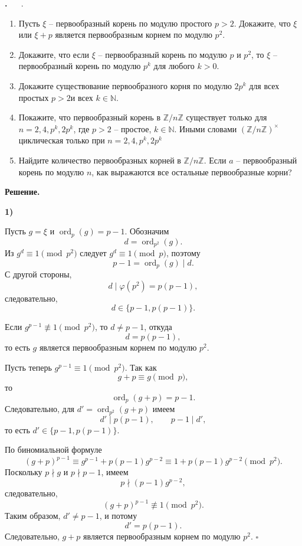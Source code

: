 \documentclass[12pt,a4paper]{article}
\newcounter{task}                   %
\newenvironment{task}[1][]{%
  \refstepcounter{task}%
  \par\vspace{0.3\baselineskip}%
  \noindent\textbf{\thetask.}%
  \if\relax\detokenize{#1}\relax   %
    \ \ignorespaces                 %
  \else
    \ \textbf{#1}.\ \ignorespaces   %
  \fi
}{%
  \par\vspace{0.2\baselineskip}%
}
\newcommand{\sol}{%
  \par\vspace{0.3\baselineskip}%
  \noindent\textbf{Решение.}\ %
  \ignorespaces                     %
}
\newcommand{\soli}[1]{%
  \par\vspace{0.15\baselineskip}%
  \noindent\textbf{#1)}\ %
  \ignorespaces                     %
}
\begin{document}
\begin{task}
    \begin{enumerate}
	\item Пусть $\xi$ -- первообразный корень по модулю простого $p > 2$. Докажите, что $\xi$ или $\xi + p$ является первообразным корнем по модулю $p^2$.
	\item Докажите, что если $\xi$ -- первообразный корень по модулю $p$ и $p^2$, то $\xi$ -- первообразный корень по модулю $p^k$ для любого $k > 0$.
	\item Докажите существование первообразного корня по модулю $2p^k$ для всех простых $p > 2$и всех $k \in \mathbb{N}$.
	\item Покажите, что первообразный корень в $\mathbb{Z}/n\mathbb{Z}$ существует только для $n = 2, 4, p^k, 2p^k$, где $p > 2$ -- простое, $k \in \mathbb{N}$. Иными словами $(\mathbb{Z}/n\mathbb{Z})^\times$ циклическая только при $n = 2,4,p^k,2p^k$
	\item Найдите количество первообразных корней в $\mathbb{Z}/n\mathbb{Z}$. Если $a$ -- первообразный корень по модулю $n$, как выражаются все остальные первообразные корни?   
    \end{enumerate}
\end{task}

\sol
\soli{1}

Пусть $g=\xi$ и $\operatorname{ord}_p(g)=p-1$. Обозначим
\[
d=\operatorname{ord}_{p^2}(g).
\]
Из $g^d\equiv1\pmod{p^2}$ следует $g^d\equiv1\pmod p$, поэтому
\[
p-1=\operatorname{ord}_p(g)\mid d.
\]
С другой стороны,
\[
d\mid\varphi(p^2)=p(p-1),
\]
следовательно,
\[
d\in\{p-1,p(p-1)\}.
\]

Если $g^{p-1}\not\equiv1\pmod{p^2}$, то $d\neq p-1$, откуда
\[
d=p(p-1),
\]
то есть $g$ является первообразным корнем по модулю $p^2$.

Пусть теперь $g^{p-1}\equiv1\pmod{p^2}$. Так как
\[
g+p\equiv g\pmod p,
\]
то
\[
\operatorname{ord}_p(g+p)=p-1.
\]
Следовательно, для $d'=\operatorname{ord}_{p^2}(g+p)$ имеем
\[
d'\mid p(p-1),\qquad p-1\mid d',
\]
то есть $d'\in\{p-1,p(p-1)\}$.

По биномиальной формуле
\[
(g+p)^{p-1}
\equiv g^{p-1}+p(p-1)g^{p-2}
\equiv1+p(p-1)g^{p-2}\pmod{p^2}.
\]
Поскольку $p\nmid g$ и $p\nmid p-1$, имеем
\[
p\nmid(p-1)g^{p-2},
\]
следовательно,
\[
(g+p)^{p-1}\not\equiv1\pmod{p^2}.
\]
Таким образом, $d'\neq p-1$, и потому
\[
d'=p(p-1).
\]
Следовательно, $g+p$ является первообразным корнем по модулю $p^2$.
\hfill $\square$

\newpage
\end{document}
